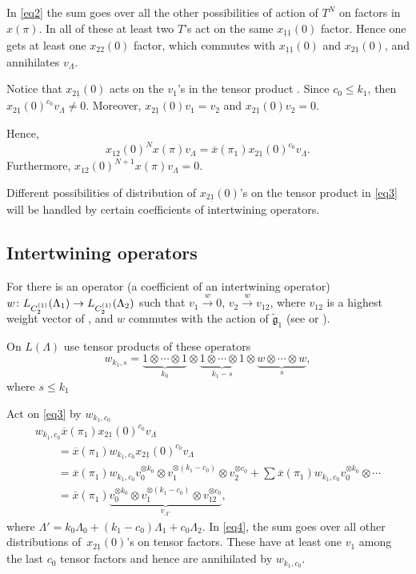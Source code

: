 \documentclass[pdftex]{sigma}
\newcommand{\gt}
{\tilde{{\mathfrak g}}}
\newcommand{\ox}
{{\overline{x}}}
\numberwithin{equation}{section}
\begin{document}
In \eqref{eq2} the sum goes over all the other possibilities of action of $T^N$ on factors in $x(\pi)$. In all of these at least two $T$'s act on the same $x_{\underline{1} \underline{1}}(0)$ factor. Hence one gets at least one $x_{2 2}(0)$ factor, which commutes with $x_{\underline{1} \underline{1}}(0)$ and $x_{2 \underline{1}}(0)$, and annihilates $v_\Lambda$.

Notice that $x_{2\underline{1}}(0)$ acts on the $v_1$'s in the tensor product . Since $c_0\leq k_1$, then $x_{2\underline{1}}(0)^{c_0} v_\Lambda\neq 0$.
Moreover, $x_{2\underline{1}}(0) v_1 = v_2$ and $x_{2\underline{1}}(0) v_2 = 0$.

Hence,
\begin{equation} \label{trans}
x_{12}(0)^N x(\pi)v_\Lambda = \ox(\pi_1) x_{2\underline{1}}(0)^{c_0} v_\Lambda.
\end{equation}
Furthermore,
$x_{12}(0)^{N+1} x(\pi)v_\Lambda = 0$.

Different possibilities of distribution of $x_{2\underline{1}}(0)$'s on the tensor product  in \eqref{eq3} will be handled by certain coefficients of intertwining operators.

\subsection{Intertwining operators}

For  there is an operator (a coefficient of an intertwining operator) $w\colon \smash{L_{C_2^{(1)}}(\Lambda_1)}\to \smash{L_{C_2^{(1)}}(\Lambda_2)}$ such that
$v_1 \xrightarrow{w} 0$, $ v_2 \xrightarrow{w} v_{12}$,
where $v_{12}$ is a highest weight vector of , and $w$ commutes with the action of $\gt_1$ (see \cite[Proposition~7]{BPT} or \cite[Remark~6.3]{P}).

On $L(\Lambda)$ use tensor products of these operators
\[w_{k_1,s}=\underbrace{1\otimes\cdots\otimes 1}_{k_0}\otimes \underbrace{1\otimes\cdots\otimes 1}_{k_1 - s}\otimes \underbrace{w\otimes\cdots\otimes w}_{s},\]
where $s\leq k_1$

Act on \eqref{eq3} by $w_{k_1,c_0}$
\begin{gather}
	w_{k_1,c_0}  \ox(\pi_1) x_{2\underline{1}}(0)^{c_0} v_\Lambda\nonumber\\
\qquad = \ox(\pi_1) w_{k_1,c_0} x_{2\underline{1}}(0)^{c_0} v_\Lambda\nonumber \\
	\qquad = \ox(\pi_1) w_{k_1,c_0} v_0^{\otimes k_0}\otimes v_1^{\otimes (k_1-c_0)}\otimes v_2^{\otimes c_0} + \sum \ox(\pi_1) w_{k_1,c_0} v_0^{\otimes k_0}\otimes \cdots \label{eq4}\\
	\qquad = \ox(\pi_1) \underbrace{v_0^{\otimes k_0}\otimes v_1^{\otimes (k_1-c_0)}\otimes v_{12}^{\otimes c_0}}_{v_{\Lambda'}},\nonumber
\end{gather}
where $\Lambda'=k_0 \Lambda_0+(k_1-c_0)\Lambda_1 + c_0 \Lambda_2$.
In \eqref{eq4}, the sum goes over all other distributions of~$x_{2\underline{1}}(0)$'s on tensor factors. These have at least one $v_1$ among the last $c_0$ tensor factors and hence are annihilated by $w_{k_1,c_0}$.
\end{document}
